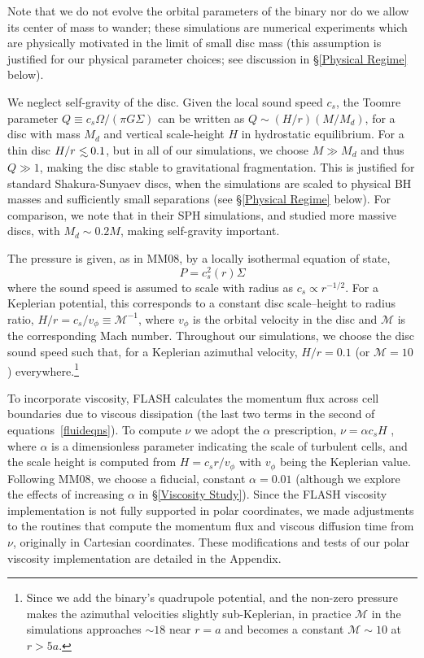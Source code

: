 Note that we do not evolve the orbital parameters of the binary nor do we allow its center of mass to wander; 
these simulations are numerical experiments which are physically motivated in the limit of small disc mass 
(this assumption is justified for our physical parameter choices; see discussion in \S\ref{Physical Regime} below).

We neglect self-gravity of the disc. Given the local sound speed
$c_s$, the Toomre parameter $Q\equiv c_s \Omega /\left( \pi G \Sigma
\right)$ can be written as $Q \sim (H/r)(M/M_d)$, for a disc with mass
$M_d$ and vertical scale-height $H$ in hydrostatic equilibrium. For a
thin disc $H/r \lsim 0.1$, but in all of our simulations, we choose $M
\gg M_d$ and thus $Q \gg 1$, making the disc stable to gravitational
fragmentation. This is justified for standard Shakura-Sunyaev discs,
when the simulations are scaled to physical BH masses and sufficiently
small separations (see \S\ref{Physical Regime} below).  For
comparison, we note that in their SPH simulations, \cite{Cuadra:2009}
and \cite{Roedig:2012} studied more massive discs, with $M_d
\sim 0.2 M$, making self-gravity important.

The pressure is given, as in MM08, by a locally isothermal equation of
state,
%
\begin{equation}
P = c_s^2(r) \Sigma
\end{equation}
%
where the sound speed is assumed to scale with radius as $c_s \propto
r^{-1/2}$. For a Keplerian potential, this corresponds to a constant
disc scale--height to radius ratio, $H/r = c_s / v_{\phi} \equiv
\mathcal{M}^{-1}$, where $v_{\phi}$ is the orbital velocity in the
disc and $\mathcal{M}$ is the corresponding Mach number.  Throughout
our simulations, we choose the disc sound speed such that, for a
Keplerian azimuthal velocity, $H/r=0.1$ (or $\mathcal{M}=10$)
everywhere.\footnote{Since we add the binary's quadrupole
  potential, and the non-zero pressure makes the azimuthal velocities
  slightly sub-Keplerian, in practice $\mathcal{M}$ in the simulations
  approaches $\sim 18$ near $r=a$ and becomes a constant
  $\mathcal{M}\sim 10$ at $r>5a$.}

To incorporate viscosity, FLASH calculates the momentum flux across
cell boundaries due to viscous dissipation (the last two terms in the
second of equations~\ref{fluideqns}). To compute $\nu$ we adopt the
$\alpha$ prescription, $\nu=\alpha c_s H$ \citep{SS73}, where $\alpha$
is a dimensionless parameter indicating the scale of turbulent cells,
and the scale height is computed from $H = c_s r / v_{\phi}$ with
$v_{\phi}$ being the Keplerian value.  Following MM08, we choose a fiducial,
constant $\alpha=0.01$ (although we explore the effects of increasing $\alpha$ in \S \ref{Viscosity Study}). 
Since the FLASH viscosity implementation is not fully supported in
polar coordinates, we made adjustments to the routines that compute
the momentum flux and viscous diffusion time from $\nu$, originally in Cartesian coordinates. 
These modifications and tests of our polar viscosity implementation are detailed in the Appendix.


